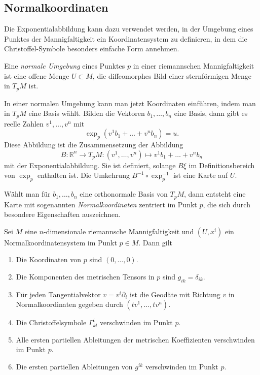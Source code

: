 %
%
\subsection{Normalkoordinaten}
Die Exponentialabbildung kann dazu verwendet werden, in der
Umgebung eines Punktes der Mannigfaltigkeit ein Koordinatensystem
zu definieren, in dem die Christoffel-Symbole besonders einfache
Form annehmen.

\begin{definition}
Eine \emph{normale Umgebung} eines Punktes $p$ in einer 
riemannschen Mannigfaltigkeit ist eine offene Menge $U\subset M$,
die diffeomorphes Bild einer sternförmigen Menge in $T_pM$ ist.
\end{definition}

In einer normalen Umgebung kann man jetzt Koordinaten einführen,
indem man in $T_pM$ eine Basis wählt.
Bilden die Vektoren $b_1,\dots,b_n$ eine Basis, dann gibt es reelle
Zahlen $v^1,\dots,v^n$ mit 
\[
\exp_p(v^1b_1+\dots+v^nb_n)=u.
\]
Diese Abbildung ist die Zusammensetzung der 
Abbildung
\[
B
\colon
\mathbb{R}^n \to T_pM
:
(v^1,\dots,v^n)
\mapsto
v^1b_1+\dots+v^nb_n
\]
mit der Exponentialabbildung.
Sie ist definiert, solange $B\xi$ im Definitionsbereich von $\exp_p$
enthalten ist.
Die Umkehrung $B^{-1}\circ\exp_p^{-1}$ ist eine Karte auf $U$.

Wählt man für $b_1,\dots,b_n$ eine orthonormale Basis von $T_pM$,
dann entsteht eine Karte mit sogenannten \emph{Normalkoordinaten}
zentriert im Punkt $p$,
die sich durch besondere Eigenschaften auszeichnen.

\begin{satz}
\label{zusammenhang:geodaeten:satz:normalkoordinaten}
Sei $M$ eine $n$-dimensionale riemannsche Mannigfaltigkeit und $(U,x^i)$
ein Normalkoordinatensystem im Punkt $p\in M$.
Dann gilt
\begin{enumerate}
\item Die Koordinaten von $p$  sind $(0,\dots,0)$.
\item Die Komponenten des metrischen Tensors in $p$ sind $g_{ik}=\delta_{ik}$.
\item Für jeden Tangentialvektor $v=v^i\partial_i$ ist die Geodäte mit
Richtung $v$ in Normalkoordinaten gegeben durch $(tv^1,\dots,tv^n)$.
\item Die Christoffelsymbole $\Gamma^i_{kl}$ verschwinden im Punkt $p$.
\item Alle ersten partiellen Ableitungen der metrischen Koeffizienten
verschwinden im Punkt $p$.
\item Die ersten partiellen Ableitungen von $g^{ik}$ verschwinden im Punkt $p$.
\end{enumerate}
\end{satz}

